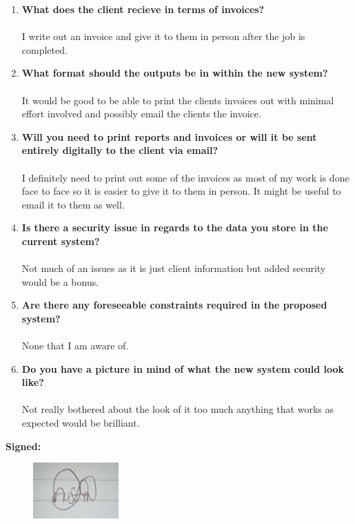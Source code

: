 \begin{enumerate}
	\item \textbf{What does the client recieve in terms of invoices?}
		\\ \\ I write out an invoice and give it to them in person after the job is completed.
	\item \textbf{What format should the outputs be in within the new system?}
		\\ \\ It would be good to be able to print the clients invoices out with minimal effort involved and possibly email the clients the invoice.
	\item \textbf{Will you need to print reports and invoices or will it be sent entirely digitally to the client via email?}
		\\ \\ I definitely need to print out some of the invoices as most of my work is done face to face so it is easier to give it to them in person. It might be useful to email it to them as well.
	\item \textbf{Is there a security issue in regards to the data you store in the current system?}
		\\ \\ Not much of an issues as it is just client information  but added security would be a bonus.
	\item \textbf{Are there any foreseeable constraints required in the proposed system?}
		\\ \\ None that I am aware of.
	\item \textbf{Do you have a picture in mind of what the new system could look like?}
		\\ \\ Not really bothered about the look of it too much anything that works as expected would be brilliant.
\end{enumerate}

\begin{flushleft}
	\textbf{Signed:}
\begin{figure}[H]
    \includegraphics{./Analysis/images/signature.jpg}
\end{figure}

\end{flushleft}
		





